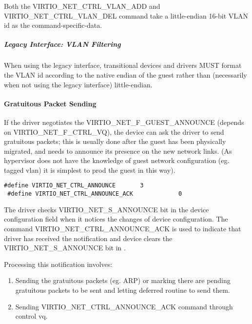 Both the VIRTIO_NET_CTRL_VLAN_ADD and VIRTIO_NET_CTRL_VLAN_DEL
command take a little-endian 16-bit VLAN id as the command-specific-data.

\subparagraph{Legacy Interface: VLAN Filtering}\label{sec:Device Types / Network Device / Device Operation / Control Virtqueue / VLAN Filtering / Legacy Interface: VLAN Filtering}
When using the legacy interface, transitional devices and drivers
MUST format the VLAN id
according to the native endian of the guest rather than
(necessarily when not using the legacy interface) little-endian.

\paragraph{Gratuitous Packet Sending}\label{sec:Device Types / Network Device / Device Operation / Control Virtqueue / Gratuitous Packet Sending}

If the driver negotiates the VIRTIO_NET_F_GUEST_ANNOUNCE (depends
on VIRTIO_NET_F_CTRL_VQ), the device can ask the driver to send gratuitous
packets; this is usually done after the guest has been physically
migrated, and needs to announce its presence on the new network
links. (As hypervisor does not have the knowledge of guest
network configuration (eg. tagged vlan) it is simplest to prod
the guest in this way).

\begin{lstlisting}
#define VIRTIO_NET_CTRL_ANNOUNCE       3
 #define VIRTIO_NET_CTRL_ANNOUNCE_ACK             0
\end{lstlisting}

The driver checks VIRTIO_NET_S_ANNOUNCE bit in the device configuration  field
when it notices the changes of device configuration. The
command VIRTIO_NET_CTRL_ANNOUNCE_ACK is used to indicate that
driver has received the notification and device clears the
VIRTIO_NET_S_ANNOUNCE bit in .

Processing this notification involves:

\begin{enumerate}
\item Sending the gratuitous packets (eg. ARP) or marking there are pending
  gratuitous packets to be sent and letting deferred routine to
  send them.

\item Sending VIRTIO_NET_CTRL_ANNOUNCE_ACK command through control
  vq.
\end{enumerate}

